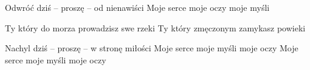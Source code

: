 \documentclass[../../../songbook.tex]{subfiles}
\begin{document}
\-\hspace{1cm} Odwróć dziś – proszę – od nienawiści \newline
\-\hspace{1cm} Moje serce moje oczy moje myśli \newline

Ty który do morza \newline
prowadzisz swe rzeki \newline
Ty który zmęczonym \newline
zamykasz powieki \newline

\-\hspace{1cm} Nachyl dziś – proszę – w stronę miłości \newline
\-\hspace{1cm} Moje serce moje myśli moje oczy \newline
\-\hspace{1cm} Moje serce moje myśli moje oczy
\end{document}
